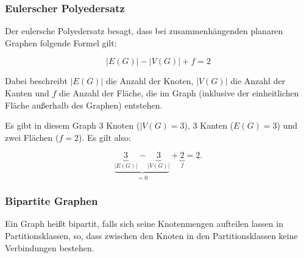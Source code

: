 \documentclass{scrartcl}
\begin{document}
\subsubsection{Eulerscher Polyedersatz}

Der eulersche Polyedersatz besagt, dass bei zusammenhängenden planaren Graphen
folgende Formel gilt:

\begin{equation}
	|E(G)| - |V(G)| + f = 2
\end{equation}

Dabei beschreibt $|E(G)|$ die Anzahl der Knoten, $|V(G)|$ die Anzahl der Kanten
und $f$ die Anzahl der Fläche, die im Graph (inklusive der einheitlichen Fläche
außerhalb des Graphen) entstehen.

\begin{center}
\end{center}

Es gibt in diesem Graph 3 Knoten ($|V(G) = 3$), 3 Kanten ($E(G) = 3$) und zwei
Flächen ($f = 2$). Es gilt also:

\begin{equation}
	\underbrace{\underbrace{3}_{|E(G)|} - \underbrace{3}_{|V(G)|}}_{= 0} + \underbrace{2}_{f} = 2.
\end{equation}

\subsubsection{Bipartite Graphen}
\label{bipartit}

Ein Graph heißt \frq bipartit\flq, falls sich seine Knotenmengen aufteilen lassen
in Partitionsklassen, so, dass zwischen den Knoten in den Partitionsklassen keine
Verbindungen bestehen.
\end{document}
